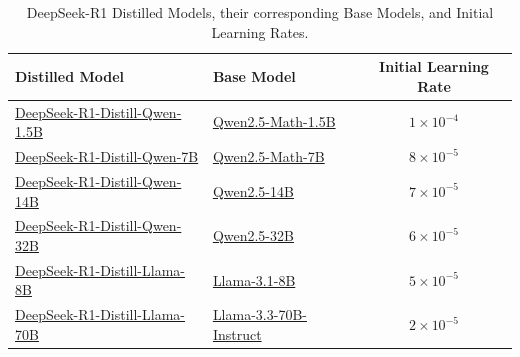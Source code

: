 
\begin{table}[h]
    \centering
      \caption{DeepSeek-R1 Distilled Models, their corresponding Base Models, and Initial Learning Rates.}
    \label{tab:distill_config}
    \begin{tabular}{llc}
        \toprule
        \textbf{Distilled Model} & \textbf{Base Model} & \textbf{Initial Learning Rate} \\
        \midrule
        \href{https://huggingface.co/deepseek-ai/DeepSeek-R1-Distill-Qwen-1.5B}{DeepSeek-R1-Distill-Qwen-1.5B} &
        \href{https://huggingface.co/Qwen/Qwen2.5-Math-1.5B}{Qwen2.5-Math-1.5B} & $1\times10^{-4}$ \\
        \href{https://huggingface.co/deepseek-ai/DeepSeek-R1-Distill-Qwen-7B}{DeepSeek-R1-Distill-Qwen-7B} &
        \href{https://huggingface.co/Qwen/Qwen2.5-Math-7B}{Qwen2.5-Math-7B} & $8\times10^{-5}$ \\
        \href{https://huggingface.co/deepseek-ai/DeepSeek-R1-Distill-Qwen-14B}{DeepSeek-R1-Distill-Qwen-14B} &
        \href{https://huggingface.co/Qwen/Qwen2.5-14B}{Qwen2.5-14B} & $7\times10^{-5}$ \\
        \href{https://huggingface.co/deepseek-ai/DeepSeek-R1-Distill-Qwen-32B}{DeepSeek-R1-Distill-Qwen-32B} &
        \href{https://huggingface.co/Qwen/Qwen2.5-32B}{Qwen2.5-32B} & $6\times10^{-5}$ \\
        \href{https://huggingface.co/deepseek-ai/DeepSeek-R1-Distill-Llama-8B}{DeepSeek-R1-Distill-Llama-8B} &
        \href{https://huggingface.co/meta-llama/Llama-3.1-8B}{Llama-3.1-8B} & $5\times10^{-5}$ \\
        \href{https://huggingface.co/deepseek-ai/DeepSeek-R1-Distill-Llama-70B}{DeepSeek-R1-Distill-Llama-70B} &
        \href{https://huggingface.co/meta-llama/Llama-3.3-70B-Instruct}{Llama-3.3-70B-Instruct} & $2\times10^{-5}$ \\
        \bottomrule
    \end{tabular}
  
\end{table}